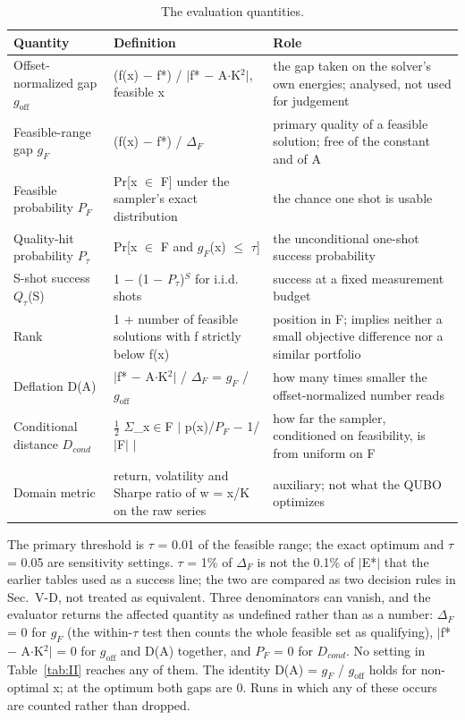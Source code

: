 \documentclass{ieeeaccess}
\begin{document}
\begin{table}[!t]
\centering
\scriptsize
\caption{The evaluation quantities.}
\label{tab:I}
\begin{tabular}{p{}p{}p{}}
\toprule
Quantity & Definition & Role \\
\midrule
Offset-normalized gap $g_{\mathrm{off}}$ & (f(x) $-$ f*) / $|$f* $-$ A$\cdot$K$^{2}$$|$, feasible x & the gap taken on the solver's own energies; analysed, not used for judgement \\
Feasible-range gap $g_{F}$ & (f(x) $-$ f*) / $\Delta_{F}$ & primary quality of a feasible solution; free of the constant and of A \\
Feasible probability $P_{F}$ & Pr[x $\in$ F] under the sampler's exact distribution & the chance one shot is usable \\
Quality-hit probability $P_{\tau}$ & Pr[x $\in$ F and $g_{F}$(x) $\leq$ $\tau$] & the unconditional one-shot success probability \\
S-shot success $Q_{\tau}$(S) & 1 $-$ (1 $-$ $P_{\tau}$)$^{S}$ for i.i.d. shots & success at a fixed measurement budget \\
Rank & 1 + number of feasible solutions with f strictly below f(x) & position in F; implies neither a small objective difference nor a similar portfolio \\
Deflation D(A) & $|$f* $-$ A$\cdot$K$^{2}$$|$ / $\Delta_{F}$ = $g_{F}$ / $g_{\mathrm{off}}$ & how many times smaller the offset-normalized number reads \\
Conditional distance $D_{cond}$ & $\tfrac{1}{2}$ $\Sigma$\_{x$\in$F} $|$ p(x)/$P_{F}$ $-$ 1/$|$F$|$ $|$ & how far the sampler, conditioned on feasibility, is from uniform on F \\
Domain metric & return, volatility and Sharpe ratio of w = x/K on the raw series & auxiliary; not what the QUBO optimizes \\
\bottomrule
\end{tabular}
\end{table}


The primary threshold is $\tau$ = 0.01 of the feasible range; the exact optimum and $\tau$ = 0.05 are sensitivity settings. $\tau$ = 1\% of $\Delta_{F}$ is not the 0.1\% of $|$E*$|$ that the earlier tables used as a success line; the two are compared as two decision rules in Sec.~V-D, not treated as equivalent. Three denominators can vanish, and the evaluator returns the affected quantity as undefined rather than as a number: $\Delta_{F}$ = 0 for $g_{F}$ (the within-$\tau$ test then counts the whole feasible set as qualifying), $|$f* $-$ A$\cdot$K$^{2}$$|$ = 0 for $g_{\mathrm{off}}$ and D(A) together, and $P_{F}$ = 0 for $D_{cond}$. No setting in Table~\ref{tab:II} reaches any of them. The identity D(A) = $g_{F}$ / $g_{\mathrm{off}}$ holds for non-optimal x; at the optimum both gaps are 0. Runs in which any of these occurs are counted rather than dropped.
\end{document}
